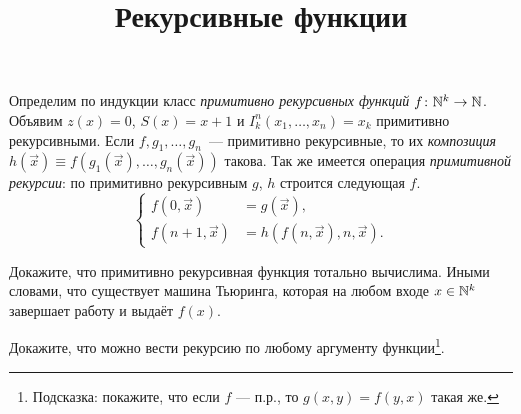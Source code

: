 \documentclass[a4paper, 12pt, num=Г1]{listok}
\begin{document}
\title{Рекурсивные функции}
\maketitle
\begin{definition}
	Определим по индукции класс \textit{примитивно рекурсивных функций $f \colon \mathbb{N}^k \to \mathbb{N}$}.
	Объявим $z(x) = 0$, $S(x) = x + 1$ и $I_k^n(x_1, \dots, x_n) = x_k$ примитивно рекурсивными.
	Если $f, g_1, \dots, g_n$~--- примитивно рекурсивные,
	то их \textit{композиция} $h(\vec x) \equiv f(g_1(\vec x), \dots, g_n(\vec x))$ такова.
	Так же имеется операция \textit{примитивной рекурсии}: по примитивно рекурсивным $g$, $h$ строится следующая $f$.
	\[
		\left \{
			\begin{aligned}
				f(0, \vec x) & = g(\vec x),\\
				f(n + 1, \vec x) & = h(f(n, \vec x), n, \vec x).
			\end{aligned}
		\right .
	\]
\end{definition}
\begin{problem}
	Докажите, что примитивно рекурсивная функция тотально вычислима.
	Иными словами, что существует машина Тьюринга, которая на любом входе $x \in \mathbb{N}^k$ завершает работу и выдаёт $f(x)$.
\end{problem}
\begin{problem}
	Докажите, что можно вести рекурсию по любому аргументу функции\footnote{Подсказка: покажите, что если $f$ --- п.р.,
	то $g(x, y) = f(y, x)$ такая же.}.
\end{problem}
\end{document}
